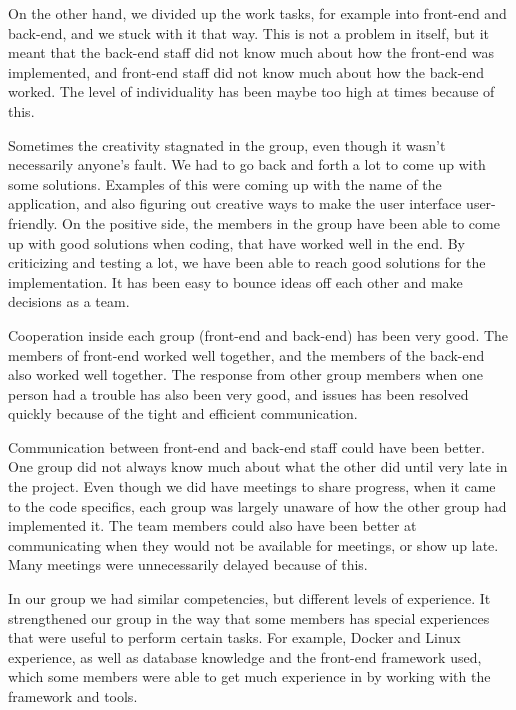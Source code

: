 On the other hand, we divided up the work tasks, for example into front-end and back-end, and we stuck with it that way. This is not a problem in itself, but it meant that the back-end staff did not know much about how the front-end was implemented, and front-end staff did not know much about how the back-end worked. The level of individuality has been maybe too high at times because of this.\newline

Sometimes the creativity stagnated in the group, even though it wasn't necessarily anyone's fault. We had to go back and forth a lot to come up with some solutions. Examples of this were coming up with the name of the application, and also figuring out creative ways to make the user interface user-friendly. On the positive side, the members in the group have been able to come up with good solutions when coding, that have worked well in the end. By criticizing and testing a lot, we have been able to reach good solutions for the implementation. It has been easy to bounce ideas off each other and make decisions as a team.\newline

Cooperation inside each group (front-end and back-end) has been very good. The members of front-end worked well together, and the members of the back-end also worked well together. The response from other group members when one person had a trouble has also been very good, and issues has been resolved quickly because of the tight and efficient communication.\newline

Communication between front-end and back-end staff could have been better. One group did not always know much about what the other did until very late in the project. Even though we did have meetings to share progress, when it came to the code specifics, each group was largely unaware of how the other group had implemented it. The team members could also have been better at communicating when they would not be available for meetings, or show up late. Many meetings were unnecessarily delayed because of this.\newline

In our group we had similar competencies, but different levels of experience. It strengthened our group in the way that some members has special experiences that were useful to perform certain tasks. For example, Docker and Linux experience, as well as database knowledge and the front-end framework used, which some members were able to get much experience in by working with the framework and tools.

